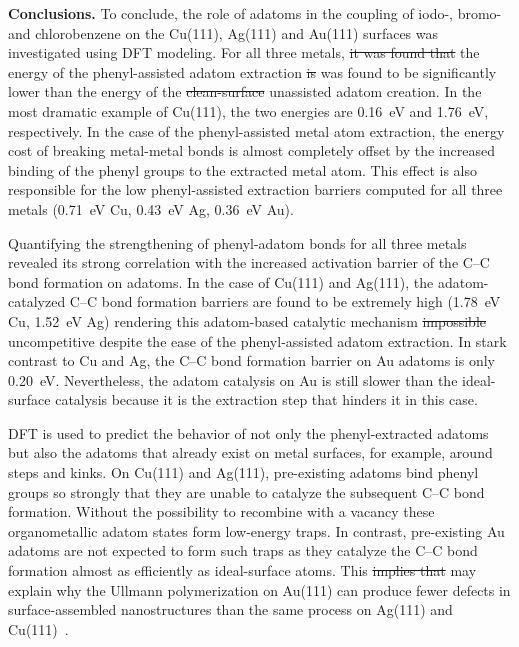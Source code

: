 \documentclass[aps,prb,amsmath,amssymb,11pt]{revtex4-1}
\newcommand{\zhzh}{\color{blue}}
\begin{document}

{\zhzh \textbf{Conclusions.}} To conclude, the role of adatoms in the coupling of iodo-, bromo- and chlorobenzene on the Cu(111), Ag(111) and Au(111) surfaces was investigated using DFT modeling. For all three metals, \sout{it was found that} the energy of the phenyl-assisted adatom extraction \sout{is} {\zhzh was found to be} significantly lower than the energy of the \sout{clean-surface} unassisted adatom creation. In the most dramatic example of Cu(111), the two energies are \SI{0.16}{\electronvolt} and \SI{1.76}{\electronvolt}, respectively. In the case of the phenyl-assisted metal atom extraction, the energy cost of breaking metal-metal bonds is almost completely offset by the increased binding of the phenyl groups to the extracted metal atom. This effect is also responsible for the low phenyl-assisted extraction barriers computed for all three metals (\SI{0.71}{\electronvolt} Cu, \SI{0.43}{\electronvolt} Ag, \SI{0.36}{\electronvolt} Au). 

Quantifying the strengthening of phenyl-adatom bonds for all three metals revealed its strong correlation with the increased activation barrier of the C--C bond formation on adatoms. In the case of Cu(111) and Ag(111), the adatom-catalyzed C--C bond formation barriers are found to be extremely high (\SI{1.78}{\electronvolt} Cu, \SI{1.52}{\electronvolt} Ag) rendering this adatom-based catalytic mechanism \sout{impossible} {\zhzh uncompetitive} despite the ease of the phenyl-assisted adatom extraction. 
In stark contrast to Cu and Ag, the C--C bond formation barrier on Au adatoms is only \SI{0.20}{\electronvolt}. Nevertheless, the adatom catalysis on Au is still slower than the ideal-surface catalysis because it is the extraction step that hinders it in this case.

DFT is used to predict the behavior of not only the phenyl-extracted adatoms but also the adatoms that already exist on metal surfaces, for example, around steps and kinks. On Cu(111) and Ag(111), pre-existing adatoms bind phenyl groups so strongly that they are unable to catalyze the subsequent C--C bond formation. Without the possibility to recombine with a vacancy these organometallic adatom states form low-energy traps. In contrast, pre-existing Au adatoms are not expected to form such traps as they catalyze the C--C bond formation almost as efficiently as ideal-surface atoms. This \sout{implies that} {\zhzh may explain why} the Ullmann polymerization on Au(111) can produce fewer defects in surface-assembled nanostructures than the same process on Ag(111) and Cu(111)~\cite{ullmann_65}.
\end{document}
